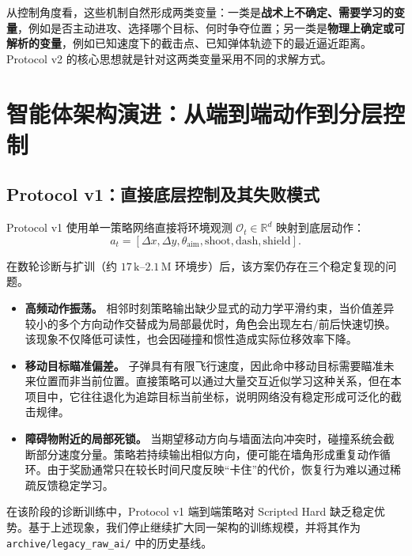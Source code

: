 \documentclass[UTF8,a4paper,11pt]{ctexart}
\begin{document}
从控制角度看，这些机制自然形成两类变量：一类是\textbf{战术上不确定、需要学习的变量}，例如是否主动进攻、选择哪个目标、何时争夺位置；另一类是\textbf{物理上确定或可解析的变量}，例如已知速度下的截击点、已知弹体轨迹下的最近逼近距离。Protocol v2 的核心思想就是针对这两类变量采用不同的求解方式。

\section{智能体架构演进：从端到端动作到分层控制}

\subsection{Protocol v1：直接底层控制及其失败模式}
Protocol v1 使用单一策略网络直接将环境观测 $\mathcal{O}_t\in\mathbb{R}^{d}$ 映射到底层动作：
\begin{equation}
    a_t =
    [\Delta x,\Delta y,\theta_{\mathrm{aim}},
    \mathrm{shoot},\mathrm{dash},\mathrm{shield}].
\end{equation}

在数轮诊断与扩训（约 $17\,\mathrm{k}$–$2.1\,\mathrm{M}$ 环境步）后，该方案仍存在三个稳定复现的问题。

\begin{itemize}
    \item \textbf{高频动作振荡。}
    相邻时刻策略输出缺少显式的动力学平滑约束，当价值差异较小的多个方向动作交替成为局部最优时，角色会出现左右/前后快速切换。该现象不仅降低可读性，也会因碰撞和惯性造成实际位移效率下降。

    \item \textbf{移动目标瞄准偏差。}
    子弹具有有限飞行速度，因此命中移动目标需要瞄准未来位置而非当前位置。直接策略可以通过大量交互近似学习这种关系，但在本项目中，它往往退化为追踪目标当前坐标，说明网络没有稳定形成可泛化的截击规律。

    \item \textbf{障碍物附近的局部死锁。}
    当期望移动方向与墙面法向冲突时，碰撞系统会截断部分速度分量。策略若持续输出相似方向，便可能在墙角形成重复动作循环。由于奖励通常只在较长时间尺度反映“卡住”的代价，恢复行为难以通过稀疏反馈稳定学习。
\end{itemize}

在该阶段的诊断训练中，Protocol v1 端到端策略对 Scripted Hard 缺乏稳定优势。基于上述现象，我们停止继续扩大同一架构的训练规模，并将其作为 \texttt{archive/legacy\_raw\_ai/} 中的历史基线。
\end{document}
